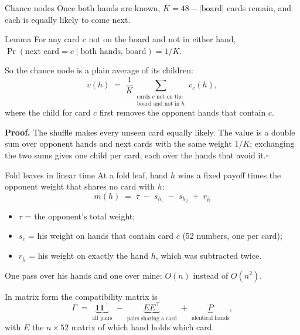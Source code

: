 \documentclass[10pt,aspectratio=169]{beamer}
\begin{document}
\begin{frame}{Chance nodes}
Once both hands are known, $K = 48-|\text{board}|$ cards remain, and each is equally likely to come next.
\begin{block}{Lemma}
For any card $c$ not on the board and not in either hand, \quad $\Pr(\text{next card}=c\mid\text{both hands, board}) = 1/K$.
\end{block}
\pause
So the chance node is a plain average of its children:
\[ v(h) \;=\; \frac1K \sum_{\substack{\text{cards } c \text{ not on the}\\ \text{board and not in } h}} v_c(h), \]
where the child for card $c$ first removes the opponent hands that contain $c$.

\pause
\small\textbf{Proof.} The shuffle makes every unseen card equally likely. The value is a double sum over opponent hands and next cards
with the same weight $1/K$; exchanging the two sums gives one child per card, each over the hands that avoid it.\hfill$\square$
\end{frame}

\begin{frame}{Fold leaves in linear time}
At a fold leaf, hand $h$ wins a fixed payoff times the opponent weight that shares no card with $h$:
\[ m(h) \;=\; \tau \;-\; s_{h_1} \;-\; s_{h_2} \;+\; r_{\bar h} \]
\begin{itemize}\setlength\itemsep{0pt}\small
\item $\tau$ = the opponent's total weight;
\item $s_c$ = his weight on hands that contain card $c$ (52 numbers, one per card);
\item $r_{\bar h}$ = his weight on exactly the hand $h$, which was subtracted twice.
\end{itemize}
One pass over his hands and one over mine: $O(n)$ instead of $O(n^2)$.

\pause
\medskip
In matrix form the compatibility matrix is
\[ \Gamma \;=\; \underbrace{\mathbf 1\mathbf 1^\top}_{\text{all pairs}} \;-\; \underbrace{E E^\top}_{\text{pairs sharing a card}} \;+\; \underbrace{P}_{\text{identical hands}} , \]
with $E$ the $n\times52$ matrix of which hand holds which card.
\end{frame}
\end{document}
